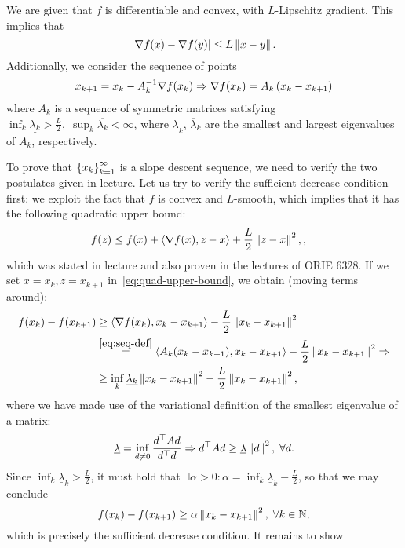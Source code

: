 \documentclass[10pt]{article}
\begin{document}
\begin{Exercise}
	We are given that $f$ is differentiable and convex, with $L$-Lipschitz
	gradient. This implies that
	\[
		\left| \nabla f(x) - \nabla f(y) \right| \leq L \left \| x - y \right \|.
	\]
	Additionally, we consider the sequence of points
	\begin{align}
		x_{k+1} = x_k - A_k^{-1} \nabla f(x_k) \Rightarrow
		\nabla f(x_k) = A_k \left(x_{k} - x_{k+1}\right)
		\label{eq:seq-def}
	\end{align}
	where $A_k$ is a sequence of symmetric matrices satisfying
	$\inf_k \underline{\lambda_k} > \frac{L}{2}, \; \sup_k \overline{\lambda_k}
	< \infty$, where $\underline{\lambda}_k$, $\overline{\lambda}_k$ are the
	smallest and largest eigenvalues of $A_k$, respectively.

	To prove that $\left\{ x_k \right\}_{k=1}^{\infty}$ is a slope descent sequence, we
	need to verify the two postulates given in lecture. Let us try to verify
	the sufficient decrease condition first: we exploit the fact that $f$ is
	convex and $L$-smooth, which implies that it has the following quadratic
	upper bound:
	\begin{align}
		f(z) &\leq f(x) + \left\langle \nabla f(x), z - x \right\rangle + \frac{L}{2} \left \| z - x \right \|^2,
		\label{eq:quad-upper-bound},
	\end{align}
	which was stated in lecture and also proven in the lectures of ORIE 6328.
	If we set $x = x_k, z = x_{k+1}$ in~\cref{eq:quad-upper-bound}, we obtain
	(moving terms around):
	\begin{align*}
		f(x_k) - f(x_{k+1}) &\geq \ip{\grad f(x_k), x_{k} - x_{k+1}}
			- \frac{L}{2} \norm{x_k - x_{k+1}}^2 \\
			&\overset{\cref{eq:seq-def}}{=} \ip{A_k (x_{k} - x_{k+1}), x_k -
		x_{k+1}} - \frac{L}{2} \norm{x_k - x_{k+1}}^2 \Rightarrow \\
			&\geq \inf_k \underline{\lambda_k} \norm{x_k - x_{k+1}}^2
			- \frac{L}{2} \norm{x_k - x_{k+1}}^2,
	\end{align*}
	where we have made use of the variational definition of the smallest
	eigenvalue of a matrix:
	\[
		\underline{\lambda} = \inf_{d \neq 0} \frac{d^\top A d}{d^\top d}
		\Rightarrow d^\top A d \geq \underline{\lambda} \left \| d \right \|^2, \; \forall
		d.
	\]
	Since $\inf_k \underline{\lambda}_k > \frac{L}{2}$, it must hold that
	$\exists \alpha > 0: \alpha = \inf_k \underline{\lambda}_k - \frac{L}{2}$,
	so that we may conclude
	\[
		f(x_k) - f(x_{k+1}) \geq \alpha \left \| x_k - x_{k+1} \right \|^2, \; \forall k
		\in \mathbb{N},
	\]
	which is precisely the sufficient decrease condition. It remains to show

\end{Exercise}
\end{document}
